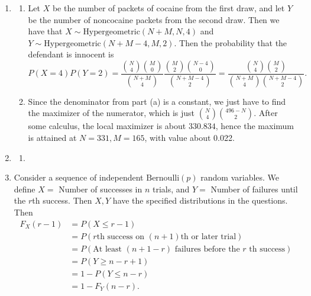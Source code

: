 \documentclass{article}
\begin{document}
\begin{enumerate}
    \item \begin{enumerate}
        \item Let $X$ be the number of packets of cocaine from the first draw, and let $Y$ be the number of 
        noncocaine packets from the second draw. Then we have that $X \sim \text{Hypergeometric}
        (N + M, N, 4)$ and $Y \sim \text{Hypergeometric}(N + M - 4, M, 2).$ Then the probability that the 
        defendant is innocent is 
        \[ P(X = 4)P(Y = 2) = \frac{\binom{N}{4}\binom{M}{0}}{\binom{N + M}{4}} 
        \frac{\binom{M}{2}\binom{N - 4}{0}}{\binom{N + M - 4}{2}} 
        = \frac{\binom{N}{4}\binom{M}{2}}{\binom{N + M}{4}\binom{N + M - 4}{2}}. \]

        \item Since the denominator from part (a) is a constant, we just have to find the maximizer of the 
        numerator, which is just $\binom{N}{4}\binom{496 - N}{2}.$ After some calculus, the local maximizer 
        is about $330.834$, hence the maximum is attained at $N = 331, M = 165$, with value about 0.022.
    \end{enumerate}

    \item \begin{enumerate}
        \item 
    \end{enumerate}

    \item Consider a sequence of independent $\text{Bernoulli}(p)$ random variables. We define $X = $
    Number of successes in $n$ trials, and $Y = $ Number of failures until the $r$th success. Then 
    $X, Y$ have the specified distributions in the questions. Then
    \begin{align*}
        F_{X}(r - 1)
        &= P(X \leq r - 1) \\
        &= P(r\text{th success on } (n + 1)\text{th or later trial}) \\
        &= P(\text{At least } (n + 1 - r) \text{ failures before the }r \text{ th success}) \\
        &= P(Y \geq n - r + 1) \\
        &= 1 - P(Y \leq n - r) \\
        &= 1 - F_{Y}(n - r).
    \end{align*}


\end{enumerate}
\end{document}
